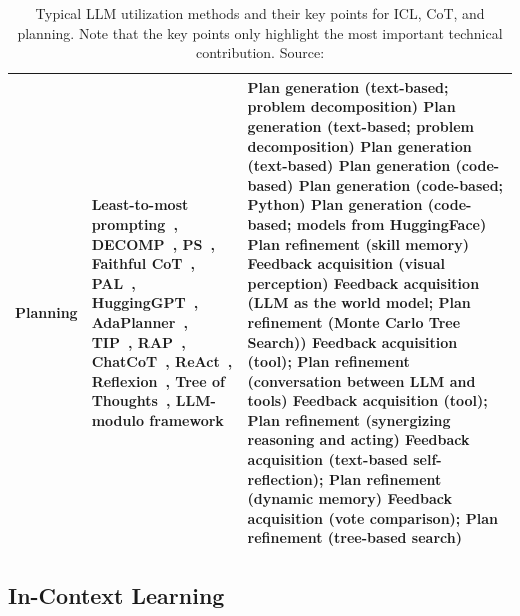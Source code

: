 \begin{table}[h!]
\begin{tabularx}{\textwidth}{|l|X|X|}
		\textbf{Planning}                         & Least-to-most prompting~\cite{zhou2022least}, DECOMP~\cite{khot2022decomposed}, PS~\cite{wang2023plan}, Faithful CoT~\cite{lyu2023faithful}, PAL~\cite{gao2022pal}, HuggingGPT~\cite{shen2023hugginggpt}, AdaPlanner~\cite{sun2023adaplanner}, TIP~\cite{lu2023multimodal}, RAP~\cite{hao2023reasoning}, ChatCoT~\cite{chen2023chatcot}, ReAct~\cite{yao2022react}, Reflexion~\cite{shinn2023reflexion}, Tree of Thoughts~\cite{yao2023tree}, LLM-modulo framework~\cite{kambhampati2024llmscantplanhelp} & Plan generation (text-based; problem decomposition) \newline Plan generation (text-based; problem decomposition) \newline Plan generation (text-based) \newline Plan generation (code-based) \newline Plan generation (code-based; Python) \newline Plan generation (code-based; models from HuggingFace) \newline Plan refinement (skill memory) \newline Feedback acquisition (visual perception) \newline Feedback acquisition (LLM as the world model; Plan refinement (Monte Carlo Tree Search)) \newline Feedback acquisition (tool); Plan refinement (conversation between LLM and tools) \newline Feedback acquisition (tool); Plan refinement (synergizing reasoning and acting) \newline Feedback acquisition (text-based self-reflection); Plan refinement (dynamic memory) \newline Feedback acquisition (vote comparison); Plan refinement (tree-based search) \\
		\hline
	\end{tabularx}
	\caption{Typical LLM utilization methods and their key points for ICL, CoT, and planning. Note that the key points only highlight the most important technical contribution. Source: \textcite{survey}}
	\label{tab:utilization-methods}
\end{table}

\subsection{In-Context Learning}
\label{sec:in-context-learning}

